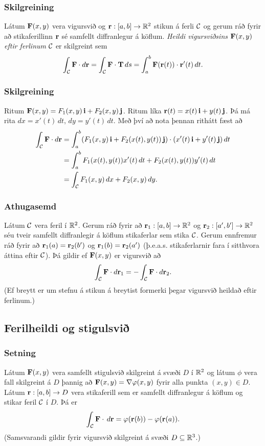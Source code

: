 \subsubsection{Skilgreining }
Látum $\mbox{${\bf F}$}(x,y)$ vera vigursvið og $\mbox{${\bf r}$}:[a,b]\rightarrow {\mathbb R}^2$ stikun á ferli $\cal C$ og gerum ráð fyrir að stikaferillinn $\mbox{${\bf r}$}$ sé samfellt diffranlegur á köflum.  {\em Heildi vigursviðsins} $\mbox{${\bf F}$}(x,y)$ {\em eftir ferlinum} $\cal C$ er skilgreint sem 
$$\int_{\cal C} \mbox{${\bf F}$}\cdot d\mbox{${\bf r}$}= \int_{\cal C} \mbox{${\bf F}$}\cdot \mbox{${\bf T}$}\,ds
=\int_a^b \mbox{${\bf F}$}(\mbox{${\bf r}$}(t))\cdot \mbox{${\bf r}$}'(t)\,dt.$$



\subsubsection{Skilgreining }
Ritum $\mbox{${\bf F}$}(x,y)=F_1(x,y)\,\mbox{${\bf i}$}+F_2(x,y)\,\mbox{${\bf j}$}$.  Ritum líka $\mbox{${\bf r}$}(t)=x(t)\,\mbox{${\bf i}$}+y(t)\,\mbox{${\bf j}$}$.  Þá má rita
$dx=x'(t)\,dt,\, dy=y'(t)\,dt$.  Með því að nota þennan rithátt fæst að 
\begin{align*}
\int_{\cal C}\mbox{${\bf F}$}\cdot d\mbox{${\bf r}$}&=\int_a^b
(F_1(x,y)\,\mbox{${\bf i}$}+F_2(x(t),y(t))\,\mbox{${\bf j}$})\cdot(x'(t)\,\mbox{${\bf i}$}+y'(t)\,\mbox{${\bf j}$})\,dt\\
&=\int_a^b F_1(x(t),y(t))x'(t)\,dt+F_2(x(t),y(t))y'(t)\,dt\\
&=\int_{\cal C} F_1(x,y)\,dx+F_2(x,y)\,dy.
\end{align*}




\subsubsection{Athugasemd }
Látum $\cal C$ vera feril í ${\mathbb R}^2$. Gerum ráð fyrir að $\mbox{${\bf r}$}_1:[a,b]\rightarrow {\mathbb R}^2$ og  $\mbox{${\bf r}$}_2:[a',b']\rightarrow {\mathbb R}^2$ séu tveir samfellt diffranlegir á köflum stikaferlar sem stika $\cal C$.  Gerum ennfremur ráð fyrir að $\mbox{${\bf r}$}_1(a)=\mbox{${\bf r}$}_2(b')$ og $\mbox{${\bf r}$}_1(b)=\mbox{${\bf r}$}_2(a')$ (þ.e.a.s. stikaferlarnir fara í sitthvora áttina eftir $\cal C$).  Þá gildir ef $\mbox{${\bf F}$}(x,y)$ er vigursvið að 
$$\int_{\cal C} \mbox{${\bf F}$}\cdot d\mbox{${\bf r}$}_1=-\int_{\cal C} \mbox{${\bf F}$}\cdot d\mbox{${\bf r}$}_2.$$
(Ef breytt er um stefnu á stikun á breytist formerki þegar vigursvið heildað eftir ferlinum.)





\subsection{Ferilheildi og stigulsvið} 

\subsubsection{Setning \rtask{}}
Látum $\mbox{${\bf F}$}(x,y)$ vera samfellt stigulsvið skilgreint á svæði $D$ í ${\mathbb R}^2$ og látum $\phi$ vera fall skilgreint á $D$ þannig að $\mbox{${\bf F}$}(x,y)=\nabla \varphi(x,y)$ fyrir alla punkta $(x,y)\in D$.   Látum $\mbox{${\bf r}$}:[a,b]\rightarrow D$ vera stikaferill sem er samfellt diffranlegur á köflum og stikar feril $\cal C$ í $D$.  Þá er
$$\int_{\cal C} \mbox{${\bf F}$}\cdot \,d\mbox{${\bf r}$}=\varphi(\mbox{${\bf r}$}(b))-\varphi(\mbox{${\bf r}$}(a)).$$
(Samsvarandi gildir fyrir vigursvið skilgreint á svæði $D\subseteq {\mathbb R}^3$.)







